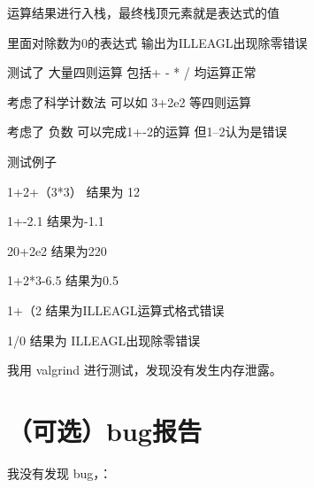 \documentclass[UTF8]{ctexart}
\begin{document}
运算结果进行入栈，最终栈顶元素就是表达式的值

里面对除数为0的表达式 输出为ILLEAGL出现除零错误

测试了 大量四则运算 包括+ - * / 均运算正常

考虑了科学计数法 可以如 3+2e2 等四则运算 
 
考虑了 负数 可以完成1+-2的运算 但1--2认为是错误

测试例子 

1+2+（3*3） 结果为 12

1+-2.1 结果为-1.1

20+2e2 结果为220

1+2*3-6.5 结果为0.5

1+（2  结果为ILLEAGL运算式格式错误

1/0  结果为 ILLEAGL出现除零错误

我用 valgrind 进行测试，发现没有发生内存泄露。

\section{（可选）bug报告}

我没有发现 bug，：
\end{document}
